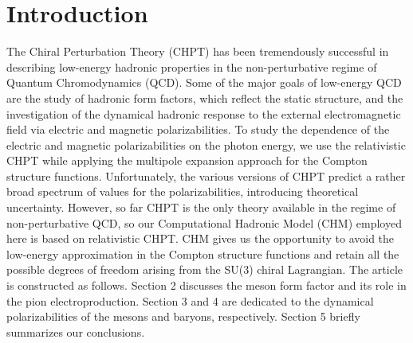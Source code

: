 \documentclass[3p,times,twocolumn]{revtex4}
\begin{document}







\section{Introduction}

The Chiral Perturbation Theory (CHPT) has been tremendously successful
in describing low-energy hadronic properties in the non-perturbative
regime of Quantum Chromodynamics (QCD). Some of the major goals of low-energy QCD are the study of hadronic form factors, which reflect the static structure, and the investigation of the dynamical hadronic response to the external electromagnetic field via
electric and magnetic polarizabilities.
 To study the dependence of the electric and magnetic polarizabilities on the photon
energy, we use the relativistic CHPT
while applying the multipole expansion approach for the Compton structure
functions. Unfortunately, the various versions of CHPT predict a rather
broad spectrum of values for the polarizabilities, introducing theoretical
uncertainty. However, so far CHPT is the only theory available in the
regime of non-perturbative QCD, so our Computational Hadronic
Model (CHM) employed here is based on relativistic CHPT. CHM gives us the opportunity
to avoid the low-energy approximation in the Compton structure functions
and retain all the possible degrees of freedom arising from the SU(3)
chiral Lagrangian. The article is constructed as follows. Section 2 discusses the meson form factor and its role in the
pion electroproduction. Section 3 and 4 are dedicated to the dynamical polarizabilities of the mesons and baryons, respectively. Section 5 briefly summarizes our conclusions. 
\end{document}
